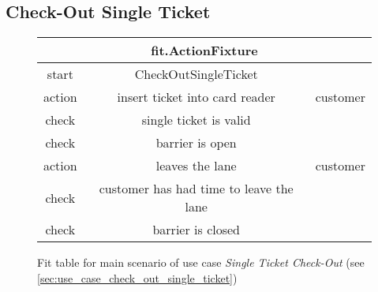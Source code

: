 \subsection{Check-Out Single Ticket}
\begin{figure}[H]
\begin{centering}
\begin{tabular}{|c|c|c|}
\hline 
\multicolumn{3}{|c|}{fit.ActionFixture}\tabularnewline
\hline 
start & CheckOutSingleTicket & \tabularnewline
\hline 
action & insert ticket into card reader & customer\tabularnewline
\hline 
check & single ticket is valid & \tabularnewline
\hline 
check & barrier is open & \tabularnewline
\hline 
action & leaves the lane & customer\tabularnewline
\hline 
check & customer has had time to leave the lane & \tabularnewline
\hline 
check & barrier is closed & \tabularnewline
\hline 
\end{tabular}
\caption{Fit table for main scenario of use case \emph{Single Ticket Check-Out} (see \autoref{sec:use_case_check_out_single_ticket})}
\end{centering}
\end{figure}
